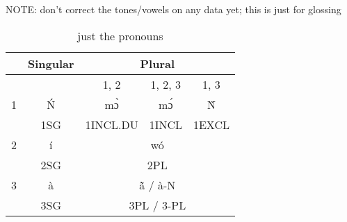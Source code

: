 \documentclass[12pt]{assets/fieldnotes}
\begin{document}
NOTE: don't correct the tones/vowels on any data yet; this is just for glossing

\begin{table}[htb!]
    \centering
    \begin{tabular}{ccccc}
        \toprule
        & Singular & \multicolumn{3}{c}{Plural} \\
        \toprule 
        & & 1, 2 & 1, 2, 3 & 1, 3 \\  
        \cmidrule(r){3-3}
        \cmidrule(r){4-4} 
        \cmidrule(r){5-5}
        1 & Ń & mɔ̀ & mɔ́ & Ǹ \\
        & 1SG & 1INCL.DU & 1INCL & 1EXCL\\
        \midrule
        2 & í & \multicolumn{3}{c}{wó} \\
         & 2SG & \multicolumn{3}{c}{2PL} \\
        \midrule
        3 & à & \multicolumn{3}{c}{\`{\~{a}} / \`{a}-N}\\
          & 3SG & \multicolumn{3}{c}{3PL / 3-PL} \\
        \bottomrule
    \end{tabular}
    \caption{just the pronouns}
    \label{tab:fut}
\end{table}
\end{document}
